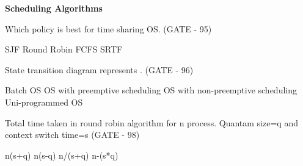 
\centerline{\textbf{ \LARGE Scheduling Algorithms}}


\setcounter{question}{0}


\begin{minipage}{\linewidth}

\question Which policy is best for time sharing OS. (GATE - 95)

\begin{oneparchoices}
   \choice SJF
   \choice Round Robin
   \choice FCFS
   \choice SRTF
\end{oneparchoices}

  \end{minipage}

\vspace{0.08in}


\begin{minipage}{\linewidth}


\question State transition diagram represents . (GATE - 96)
\begin{choices}
   \choice Batch OS
   \choice OS with preemptive scheduling
   \choice OS with non-preemptive scheduling
   \choice Uni-programmed OS
\end{choices}


  \end{minipage}

\vspace{0.08in}



\begin{minipage}{\linewidth}

\question Total time taken in round robin algorithm for n process. Quantam size=q and context switch time=s  (GATE - 98)


\begin{oneparchoices}
   \choice n(s+q)
   \choice n(s-q)
   \choice n/(s+q)
   \choice n-(s*q)
\end{oneparchoices}


  \end{minipage}

\vspace{0.08in}

